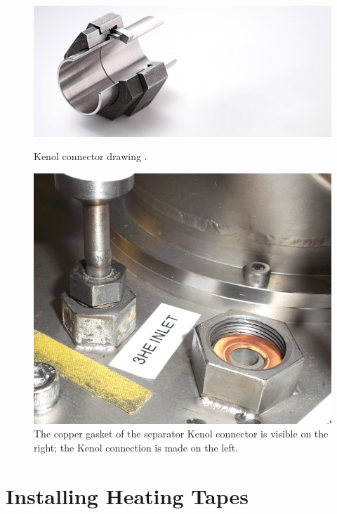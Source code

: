 \begin{figure}[htbp!]
 \centering
 \begin{minipage}{.45\textwidth}
 \includegraphics[width=\textwidth]{./img/kenol-connector.jpg}
 \caption{Kenol connector drawing \cite{techneticsgroup}.}
 \label{fig:kenol-connector}
 \end{minipage}
 \quad
  \begin{minipage}{.45\textwidth}
 \includegraphics[width=\textwidth]{./img/kenol-connectors-installation.jpg}
 \caption{The copper gasket of the separator Kenol connector is visible on the right; the \het{} Kenol connection is made on the left.}
 \label{fig:kenol-connectors-installation}
 \end{minipage}
\end{figure}


\section{Installing Heating Tapes}

